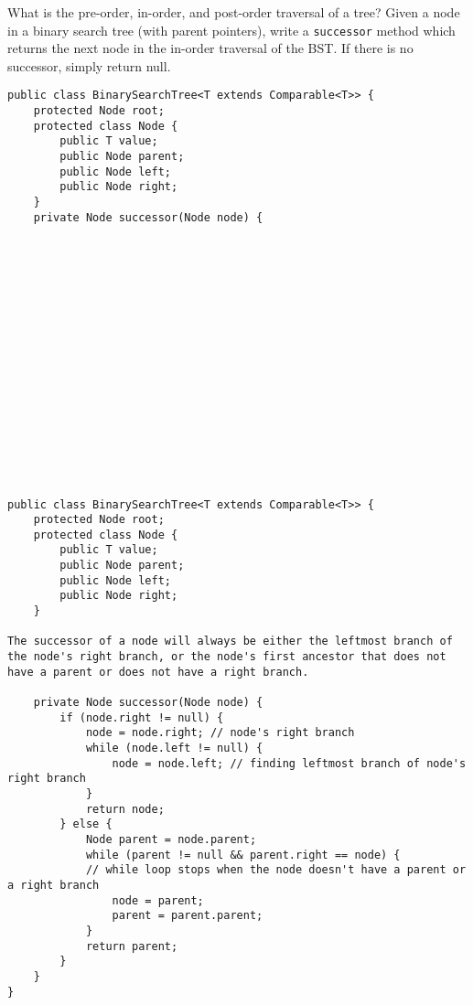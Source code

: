 \question What is the pre-order, in-order, and post-order traversal of a tree?
\newline
\newline
\newline
\question Given a node in a binary search tree (with parent pointers), write a \texttt{successor} method which returns the next node in the in-order traversal of the BST. If there is no successor, simply return null.

\ifprintanswers
\else
\begin{lstlisting}
public class BinarySearchTree<T extends Comparable<T>> {
    protected Node root;
    protected class Node {
        public T value;
        public Node parent;
        public Node left;
        public Node right;
    }
    private Node successor(Node node) {


















\end{lstlisting}
\fi

\begin{solution}
\begin{lstlisting}
public class BinarySearchTree<T extends Comparable<T>> {
    protected Node root;
    protected class Node {
        public T value;
        public Node parent;
        public Node left;
        public Node right;
    }
    
The successor of a node will always be either the leftmost branch of the node's right branch, or the node's first ancestor that does not have a parent or does not have a right branch.
    
    private Node successor(Node node) {
        if (node.right != null) {
            node = node.right; // node's right branch
            while (node.left != null) {
                node = node.left; // finding leftmost branch of node's right branch
            }
            return node;
        } else {
            Node parent = node.parent;
            while (parent != null && parent.right == node) { 
            // while loop stops when the node doesn't have a parent or a right branch
                node = parent;
                parent = parent.parent; 
            }
            return parent;
        }
    }
}
\end{lstlisting}
\end{solution}